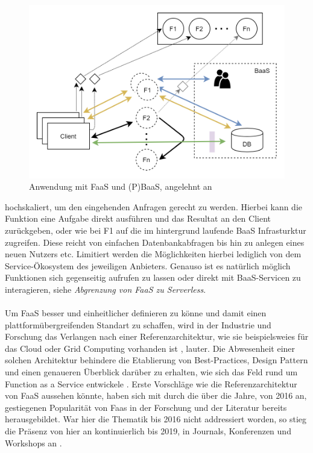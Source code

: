\documentclass[11pt]{article}
\begin{document}
\begin{figure}[H]
\caption{Anwendung mit FaaS und (P)BaaS, angelehnt an \cite{shafiei2020serverless}}
\label{fig:FaaSBaaSExample}
\centering
\includegraphics[width=1 \textwidth]{FaaS}
\end{figure}
hochskaliert, um den eingehenden Anfragen gerecht zu werden. Hierbei kann die Funktion eine Aufgabe direkt ausführen und das Resultat an den Client zurückgeben, oder wie bei F1 auf die im hintergrund laufende BaaS Infrasturktur zugreifen. Diese reicht von einfachen Datenbankabfragen bis hin zu anlegen eines neuen Nutzers etc. Limitiert werden die Möglichkeiten hierbei lediglich von dem Service-Ökosystem des jeweiligen Anbieters. Genauso ist es natürlich möglich Funktionen sich gegenseitig aufrufen zu lassen oder direkt mit BaaS-Servicen zu interagieren, siehe \textit{Abgrenzung von FaaS zu Serverless}. \\\\
Um FaaS besser und einheitlicher definieren zu könne und damit einen plattformübergreifenden Standart zu schaffen, wird in der Industrie und Forschung das Verlangen nach einer Referenzarchitektur, wie sie beispielsweies für das Cloud oder Grid Computing vorhanden ist \cite{liu2011nist}, \cite{foster2003grid} lauter. Die Abwesenheit einer solchen Architektur behindere die Etablierung von Best-Practices, Design Pattern und einen genaueren Überblick darüber zu erhalten, wie sich das Feld rund um Function as a Service entwickele \cite{leitner2019mixed}. Erste Vorschläge wie die Referenzarchitektur von FaaS aussehen könnte, haben sich mit \cite{van2019spec} durch die über die Jahre, von 2016 an, gestiegenen Popularität von Faas in der Forschung und der Literatur bereits herausgebildet. War hier die Thematik bis 2016 nicht addressiert worden, so stieg die Präsenz von hier an kontinuierlich bis 2019, in Journals, Konferenzen und Workshops an \cite{Yussupov2019_SystematicMappingStudyFaaS}. \\\\
\end{document}
